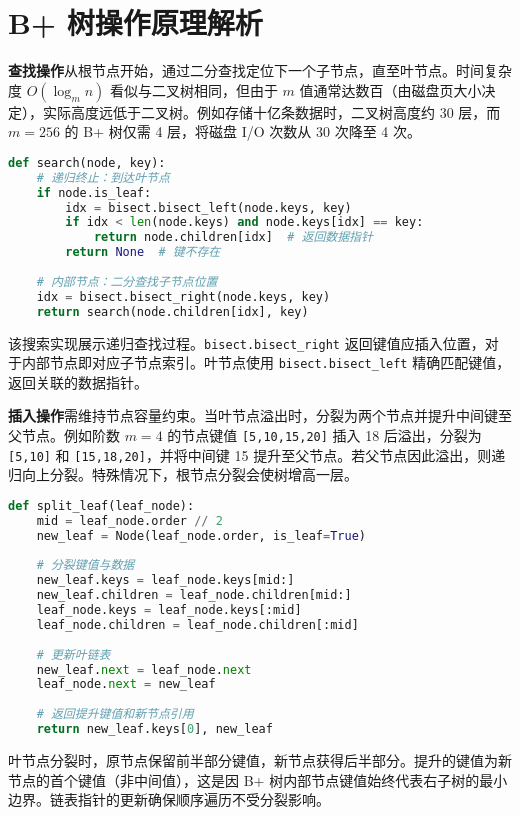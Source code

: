 \chapter{B+ 树操作原理解析}
\textbf{查找操作}从根节点开始，通过二分查找定位下一个子节点，直至叶节点。时间复杂度 $O(\log_m n)$ 看似与二叉树相同，但由于 $m$ 值通常达数百（由磁盘页大小决定），实际高度远低于二叉树。例如存储十亿条数据时，二叉树高度约 30 层，而 $m=256$ 的 B+ 树仅需 4 层，将磁盘 I/O 次数从 30 次降至 4 次。\par
\begin{lstlisting}[language=python]
def search(node, key):
    # 递归终止：到达叶节点
    if node.is_leaf:
        idx = bisect.bisect_left(node.keys, key)
        if idx < len(node.keys) and node.keys[idx] == key:
            return node.children[idx]  # 返回数据指针
        return None  # 键不存在
    
    # 内部节点：二分查找子节点位置
    idx = bisect.bisect_right(node.keys, key) 
    return search(node.children[idx], key)
\end{lstlisting}
该搜索实现展示递归查找过程。\texttt{bisect.bisect\_{}right} 返回键值应插入位置，对于内部节点即对应子节点索引。叶节点使用 \texttt{bisect.bisect\_{}left} 精确匹配键值，返回关联的数据指针。\par
\textbf{插入操作}需维持节点容量约束。当叶节点溢出时，分裂为两个节点并提升中间键至父节点。例如阶数 $m=4$ 的节点键值 \texttt{[5,10,15,20]} 插入 18 后溢出，分裂为 \texttt{[5,10]} 和 \texttt{[15,18,20]}，并将中间键 15 提升至父节点。若父节点因此溢出，则递归向上分裂。特殊情况下，根节点分裂会使树增高一层。\par
\begin{lstlisting}[language=python]
def split_leaf(leaf_node):
    mid = leaf_node.order // 2
    new_leaf = Node(leaf_node.order, is_leaf=True)
    
    # 分裂键值与数据
    new_leaf.keys = leaf_node.keys[mid:]
    new_leaf.children = leaf_node.children[mid:]
    leaf_node.keys = leaf_node.keys[:mid]
    leaf_node.children = leaf_node.children[:mid]
    
    # 更新叶链表
    new_leaf.next = leaf_node.next
    leaf_node.next = new_leaf
    
    # 返回提升键值和新节点引用
    return new_leaf.keys[0], new_leaf
\end{lstlisting}
叶节点分裂时，原节点保留前半部分键值，新节点获得后半部分。提升的键值为新节点的首个键值（非中间值），这是因 B+ 树内部节点键值始终代表右子树的最小边界。链表指针的更新确保顺序遍历不受分裂影响。\par
